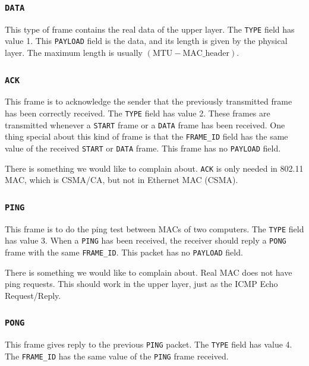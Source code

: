         \subsubsection{\texttt{DATA}}
            This type of frame contains the real data of the upper layer. The \texttt{TYPE} field has value 1. This \texttt{PAYLOAD} field is the data, and its length is given by the physical layer. The maximum length is usually $(\text{MTU} - \text{MAC\_header})$.

        \subsubsection{\texttt{ACK}}
            This frame is to acknowledge the sender that the previously transmitted frame has been correctly received. The \texttt{TYPE} field has value 2. These frames are transmitted whenever a \texttt{START} frame or a \texttt{DATA} frame has been received. One thing special about this kind of frame is that the \texttt{FRAME\_ID} field has the same value of the received \texttt{START} or \texttt{DATA} frame. This frame has no \texttt{PAYLOAD} field.

            There is something we would like to complain about. \texttt{ACK} is only needed in 802.11 MAC, which is CSMA/CA, but not in Ethernet MAC (CSMA).

        \subsubsection{\texttt{PING}}
            This frame is to do the ping test between MACs of two computers. The \texttt{TYPE} field has value 3. When a \texttt{PING} has been received, the receiver should reply a \texttt{PONG} frame with the same \texttt{FRAME\_ID}. This packet has no \texttt{PAYLOAD} field.

            There is something we would like to complain about. Real MAC does not have ping requests. This should work in the upper layer, just as the ICMP Echo Request/Reply.
        
        \subsubsection{\texttt{PONG}}
            This frame gives reply to the previous \texttt{PING} packet.  The \texttt{TYPE} field has value 4. The \texttt{FRAME\_ID} has the same value of the \texttt{PING} frame received.

